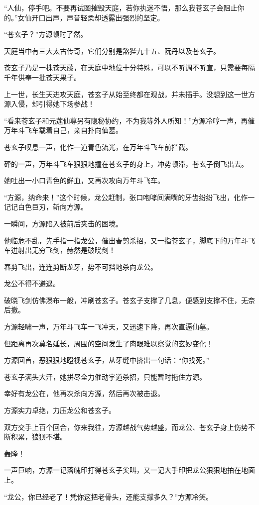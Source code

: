 \begin{this_body}
“人仙，停手吧。不要再试图摧毁天庭，若你执迷不悟，那么我苍玄子会阻止你的。”女仙开口出声，声音轻柔却透露出强烈的坚定。

“苍玄子？”方源顿时了然。

天庭当中有三大太古传奇，它们分别是煞狴九十五、阮丹以及苍玄子。

苍玄子乃是一株苍天藤，在天庭中地位十分特殊，可以不听调不听宣，只需要每隔千年供奉一批苍天果子。

上一世，长生天进攻天庭，苍玄子从始至终都在观战，并未插手。没想到这一世方源入侵，却引得她下场参战！

“看来苍玄子和元莲仙尊另有隐秘协约，不为我等外人所知！”方源冷哼一声，再催万年斗飞车载着自己，亲自扑向仙墓。

苍玄子叹息一声，化作一道青色流光，在万年斗飞车前拦截。

砰的一声，万年斗飞车狠狠地撞在苍玄子的身上，冲势顿滞，苍玄子倒飞出去。

她吐出一小口青色的鲜血，又再次攻向万年斗飞车。

“方源，纳命来！”这个时候，龙公赶制，张口咆哮间满嘴的牙齿纷纷飞出，化作一记记白色巨刃，斩向方源。

一瞬间，方源陷入被前后夹击的困境。

他临危不乱，先手指一指龙公，催出春剪杀招，又一指苍玄子，脚底下的万年斗飞车迸射出无穷飞剑，赫然是破晓剑！

春剪飞出，连连剪断龙牙，势不可挡地杀向龙公。

龙公不得不避退。

破晓飞剑仿佛瀑布一般，冲刷苍玄子。苍玄子支撑了几息，便感到支撑不住，无奈后撤。

方源轻啸一声，万年斗飞车一飞冲天，又迅速下降，再次直逼仙墓。

但距离再次莫名延长，周围的空间发生了肉眼难以察觉的玄妙变化！

方源回首，恶狠狠地瞪视苍玄子，从牙缝中挤出一句话：“你找死。”

苍玄子满头大汗，她拼尽全力催动宇道杀招，只能暂时拖住方源。

幸好有龙公在，他再次杀向方源，然后再次被击退。

方源实力卓绝，力压龙公和苍玄子。

双方交手上百个回合，你来我往，方源越战气势越盛，而龙公、苍玄子身上伤势不断积累，狼狈不堪。

轰隆！

一声巨响，方源一记落魄印打得苍玄子尖叫，又一记大手印把龙公狠狠地拍在地面上。

“龙公，你已经老了！凭你这把老骨头，还能支撑多久？”方源冷笑。


\end{this_body}
